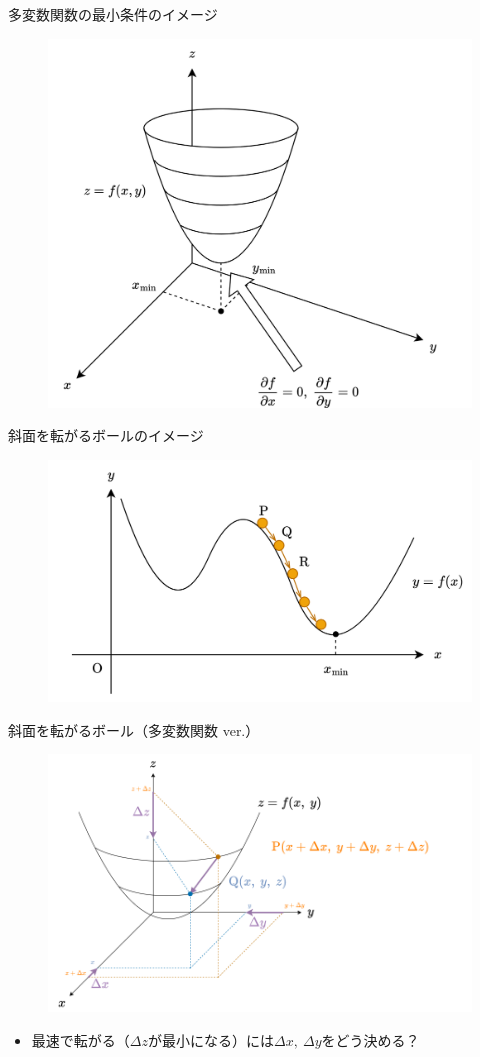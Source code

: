 \documentclass[dvipdfmx,aspectratio=169]{beamer}
\begin{document}
	\begin{frame}{多変数関数の最小条件のイメージ}
		\begin{figure}
			\centering
			\includegraphics[width=0.6\linewidth]{img/image-of-the-parameters-that-take-the-minimum-value-of-multivariable-function}
		\end{figure}
	\end{frame}
	\begin{frame}{斜面を転がるボールのイメージ}
		\begin{figure}
			\centering
			\includegraphics[width=0.7\linewidth]{img/image-of-a-ball-rolling-down-a-slope}
		\end{figure}
	\end{frame}
	\begin{frame}{斜面を転がるボール（多変数関数 ver.）}
		\begin{figure}
			\centering
			\includegraphics[width=0.7\linewidth]{img/change-in-value-of-a-multivariable-function}
		\end{figure}
		\begin{itemize}
			\item 最速で転がる（$ \Delta z $が最小になる）には$ \Delta x,\ \Delta y $をどう決める？
		\end{itemize}
	\end{frame}
\end{document}
